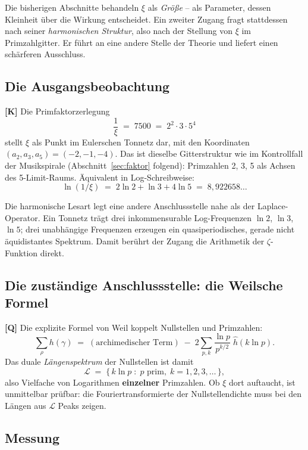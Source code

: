 Die bisherigen Abschnitte behandeln $\xi$ als \emph{Gr\"o\ss e} -- als
Parameter, dessen Kleinheit \"uber die Wirkung entscheidet. Ein zweiter
Zugang fragt stattdessen nach seiner \emph{harmonischen Struktur}, also
nach der Stellung von $\xi$ im Primzahlgitter. Er f\"uhrt an eine andere
Stelle der Theorie und liefert einen sch\"arferen Ausschluss.

\subsection{Die Ausgangsbeobachtung}

\textbf{[K]} Die Primfaktorzerlegung
\[
  \frac{1}{\xi} \;=\; 7500 \;=\; 2^2\cdot 3\cdot 5^4
\]
stellt $\xi$ als Punkt im Eulerschen Tonnetz dar, mit den Koordinaten
$(a_2, a_3, a_5) = (-2, -1, -4)$. Das ist dieselbe Gitterstruktur wie im
Kontrollfall der Musikspirale (Abschnitt~\ref{sec:faktor} folgend):
Primzahlen 2, 3, 5 als Achsen des 5-Limit-Raums. \"Aquivalent in
Log-Schreibweise:
\[
  \ln(1/\xi) \;=\; 2\ln 2 + \ln 3 + 4\ln 5 \;=\; 8{,}922658\ldots
\]

Die harmonische Lesart legt eine andere Anschlussstelle nahe als der
Laplace-Operator. Ein Tonnetz tr\"agt drei inkommensurable
Log-Frequenzen $\ln 2$, $\ln 3$, $\ln 5$; drei unabh\"angige Frequenzen
erzeugen ein quasiperiodisches, gerade nicht \"aquidistantes Spektrum.
Damit ber\"uhrt der Zugang die Arithmetik der $\zeta$-Funktion direkt.

\subsection{Die zust\"andige Anschlussstelle: die Weilsche Formel}

\textbf{[Q]} Die explizite Formel von Weil koppelt Nullstellen und
Primzahlen:
\[
  \sum_\rho h(\gamma) \;=\; (\text{archimedischer Term})
  \;-\; 2\sum_{p,k} \frac{\ln p}{p^{k/2}}\;\hat h(k\ln p).
\]
Das duale \emph{L\"angenspektrum} der Nullstellen ist damit
\[
  \mathcal{L} \;=\; \{\,k\ln p \;:\; p \text{ prim},\; k = 1,2,3,\ldots\,\},
\]
also Vielfache von Logarithmen \textbf{einzelner} Primzahlen. Ob $\xi$
dort auftaucht, ist unmittelbar pr\"ufbar: die Fouriertransformierte der
Nullstellendichte muss bei den L\"angen aus $\mathcal{L}$ Peaks zeigen.

\subsection{Messung}

